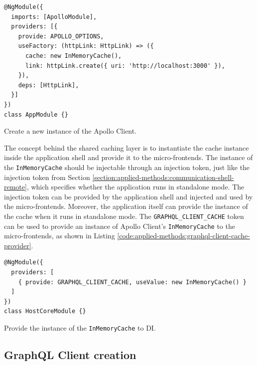 \ifshowListings
\begin{listing}[H]
  \begin{verbatim}
@NgModule({
  imports: [ApolloModule],
  providers: [{
    provide: APOLLO_OPTIONS,
    useFactory: (httpLink: HttpLink) => ({
      cache: new InMemoryCache(),
      link: httpLink.create({ uri: 'http://localhost:3000' }),
    }),
    deps: [HttpLink],
  }]
})
class AppModule {}
  \end{verbatim}
  \caption{Create a new instance of the Apollo Client.}\label{code:applied-methods:creating-the-apollo-client}
\end{listing}
\fi

\noindent The concept behind the shared caching layer is to instantiate the cache instance inside the application shell and provide it to the micro-frontends. The instance of the \texttt{InMemoryCache} should be injectable through an injection token, just like the injection token from Section \ref{section:applied-methods:communication-shell-remote}, which specifies whether the application runs in standalone mode. The injection token can be provided by the application shell and injected and used by the micro-frontends. Moreover, the application itself can provide the instance of the cache when it runs in standalone mode. The \texttt{GRAPHQL\_CLIENT\_CACHE} token can be used to provide an instance of Apollo Client's \texttt{InMemoryCache} to the micro-frontends, as shown in Listing \ref{code:applied-methods:graphql-client-cache-provider}.

\ifshowListings
\begin{listing}[H]
\begin{verbatim}
@NgModule({
  providers: [
    { provide: GRAPHQL_CLIENT_CACHE, useValue: new InMemoryCache() }
  ]
})
class HostCoreModule {}
\end{verbatim}
\caption{Provide the instance of the \texttt{InMemoryCache} to \ac{DI}.}\label{code:applied-methods:graphql-client-cache-provider}
\end{listing}
\fi

\subsection{GraphQL Client creation}\label{subsection:applied-methods:shared-caching-layer:graphql-client-creation}

